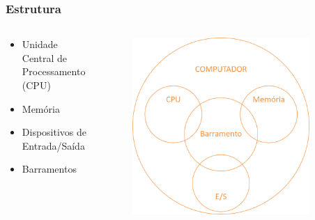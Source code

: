 \documentclass[aspectratio=169,
				xcolor=table]{beamer}
\begin{document}
	\begin{frame}
		\frametitle{Estrutura}
		\begin{columns}
			\begin{column}{0.65\textwidth}
			\begin{itemize}
				\item Unidade Central de Processamento (CPU)

				\item Memória

				\item Dispositivos de Entrada/Saída

				\item Barramentos

			\end{itemize}
			\end{column}
			\begin{column}{0.35\textwidth}
				\begin{figure}
					\centering
					\includegraphics[width=0.9\textwidth, keepaspectratio]{../figs/cap01/cpu.png} 
				\end{figure}
			\end{column}
		\end{columns}
	\end{frame}
	
\end{document}
